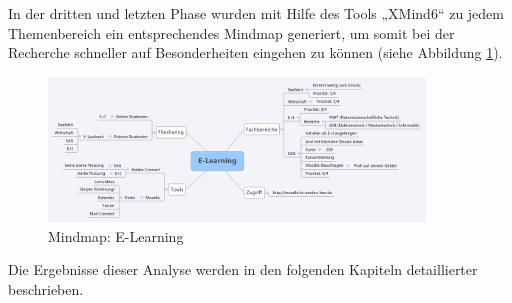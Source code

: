 In der dritten und letzten Phase wurden mit Hilfe des Tools „XMind6“ zu jedem Themenbereich ein entsprechendes Mindmap generiert, um somit bei der Recherche schneller auf Besonderheiten eingehen zu können  (siehe Abbildung \ref{fig_E-Learning_MM}).

\begin{figure}[h!]
	\centering
	\includegraphics[width=10cm]{kapitel/gruppe2/bilder/E-Learning_MM}
	\caption{Mindmap: E-Learning}
	\label{fig_E-Learning_MM}
\end{figure}

Die Ergebnisse dieser Analyse werden in den folgenden Kapiteln detaillierter beschrieben. 

